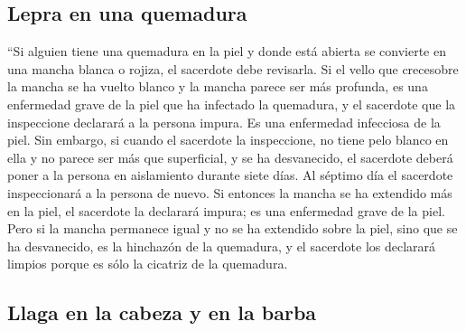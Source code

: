 \hypertarget{lepra-en-una-quemadura}{%
\subsection{Lepra en una quemadura}\label{lepra-en-una-quemadura}}

 ``Si alguien tiene una quemadura en la piel y donde está
abierta se convierte en una mancha blanca o rojiza,  el
sacerdote debe revisarla. Si el vello que crecesobre la mancha se ha
vuelto blanco y la mancha parece ser más profunda, es una enfermedad
grave de la piel que ha infectado la quemadura, y el sacerdote que la
inspeccione declarará a la persona impura. Es una enfermedad infecciosa
de la piel.  Sin embargo, si cuando el sacerdote la
inspeccione, no tiene pelo blanco en ella y no parece ser más que
superficial, y se ha desvanecido, el sacerdote deberá poner a la persona
en aislamiento durante siete días.  Al séptimo día el
sacerdote inspeccionará a la persona de nuevo. Si entonces la mancha se
ha extendido más en la piel, el sacerdote la declarará impura; es una
enfermedad grave de la piel.  Pero si la mancha permanece
igual y no se ha extendido sobre la piel, sino que se ha desvanecido, es
la hinchazón de la quemadura, y el sacerdote los declarará limpios
porque es sólo la cicatriz de la quemadura.

\hypertarget{llaga-en-la-cabeza-y-en-la-barba}{%
\subsection{Llaga en la cabeza y en la
barba}\label{llaga-en-la-cabeza-y-en-la-barba}}

